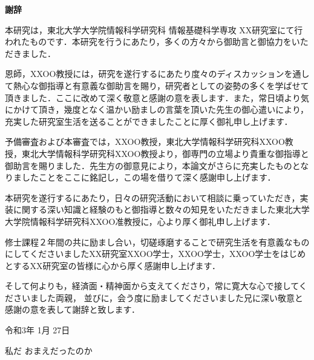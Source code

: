 \thispagestyle{empty}

\vspace*{5mm}
\noindent
{\Huge {\bf 謝辞}}\\
\bigskip

本研究は，東北大学大学院情報科学研究科 情報基礎科学専攻 XX研究室にて行われたものです．本研究を行うにあたり，多くの方々から御助言と御協力をいただきました．

恩師，XXOO教授には，研究を遂行するにあたり度々のディスカッションを通して熱心な御指導と有意義な御助言を賜り，研究者としての姿勢の多くを学ばせて頂きました．ここに改めて深く敬意と感謝の意を表します．また，常日頃より気にかけて頂き，幾度となく温かい励ましの言葉を頂いた先生の御心遣いにより，充実した研究室生活を送ることができましたことに厚く御礼申し上げます．

予備審査および本審査では，XXOO教授，東北大学情報科学研究科XXOO教授，東北大学情報科学研究科XXOO教授より，御専門の立場より貴重な御指導と御助言を賜りました．先生方の御意見により，本論文がさらに充実したものとなりましたことをここに銘記し，この場を借りて深く感謝申し上げます．

本研究を遂行するにあたり，日々の研究活動において相談に乗っていただき，実装に関する深い知識と経験のもと御指導と数々の知見をいただきました東北大学大学院情報科学研究科XXOO准教授に，心より厚く御礼申し上げます．

修士課程２年間の共に励まし合い，切磋琢磨することで研究生活を有意義なものにしてくださいましたXX研究室XXOO学士，XXOO学士，XXOO学士をはじめとするXX研究室の皆様に心から厚く感謝申し上げます．

そして何よりも，経済面・精神面から支えてくださり，常に寛大な心で接してくださいました両親，
並びに，会う度に励ましてくださいました兄に深い敬意と感謝の意を表して謝辞と致します．

\begin{flushright}
令和3年 1月 27日

私だ おまえだったのか
\end{flushright}


